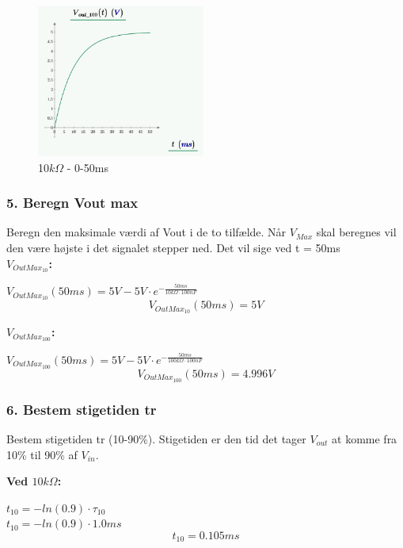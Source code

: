 \begin{center}
\begin{figure}[h]
\includegraphics[height=5cm]{M_Fig/V_out_100_1}
\caption{10$k\Omega$ - 0-50ms}
\label{100kOhm50ms}
\end{figure}
\end{center}



\subsubsection*{5. Beregn Vout max}
Beregn den maksimale værdi af Vout i de to tilfælde.
Når $V_{Max}$ skal beregnes vil den være højste i det signalet stepper ned. Det vil sige ved t = 50ms
\\
\textbf{$V_{OutMax_10}$:}

\begin{center}
$V_{OutMax_{10}}(50ms) = 5V-5V \cdot e^{-\frac{50ms}{10k\Omega \cdot 100nF}} $
\begin{equation}
V_{OutMax_{10}}(50ms)=5V
\label{V_OutMax_10}
\end{equation}
\end{center}

\textbf{$V_{OutMax_100}$:}

\begin{center}
$V_{OutMax_{100}}(50ms) = 5V-5V \cdot e^{-\frac{50ms}{100k\Omega \cdot 100nF}} $
\begin{equation}
V_{OutMax_{100}}(50ms)=4.996V
\label{V_OutMax_100}
\end{equation}
\end{center}


\subsubsection*{6. Bestem stigetiden tr}
Bestem stigetiden tr (10-90\%).
Stigetiden er den tid det tager $V_{out}$ at komme fra 10\% til 90\% af $V_{in}$.

\textbf{Ved $10k\Omega$:}\\
\begin{center}
$t_{10}=-ln(0.9)\cdot \tau_{10}$\\
$t_{10}=-ln(0.9)\cdot 1.0 ms$
\begin{equation}
t_{10}= 0.105 ms
\label{t_10_10}
\end{equation}
\end{center}


